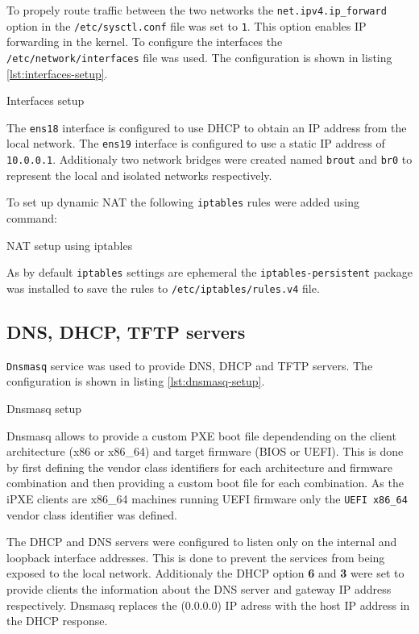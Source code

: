 \documentclass[../main.tex]{subfiles}
\begin{document}
To propely route traffic between the two networks the \texttt{net.ipv4.ip\_forward} option in the \texttt{/etc/sysctl.conf} file was set to \texttt{1}.
This option enables IP forwarding in the kernel.
To configure the interfaces the \texttt{/etc/network/interfaces} file was used. The configuration is shown in listing \ref{lst:interfaces-setup}.

\begin{listing}[H]
  \caption{Interfaces setup}
  \label{lst:interfaces-setup}
\end{listing}

The \texttt{ens18} interface is configured to use DHCP to obtain an IP address from the local network. The \texttt{ens19} interface is configured to use a static IP address of \texttt{10.0.0.1}.
Additionaly two network bridges were created named \texttt{brout} and \texttt{br0} to represent the local and isolated networks respectively.

To set up dynamic NAT the following \texttt{iptables} rules were added using command:

\begin{listing}[H]
  \caption{NAT setup using iptables}
\end{listing}

As by default \texttt{iptables} settings are ephemeral the \texttt{iptables-persistent} package was installed to save the rules to \texttt{/etc/iptables/rules.v4} file.

\subsection{DNS, DHCP, TFTP servers}

\texttt{Dnsmasq} service was used to provide DNS, DHCP and TFTP servers. The configuration is shown in listing \ref{lst:dnsmasq-setup}.

\begin{listing}[H]
  \caption{Dnsmasq setup}
  \label{lst:dnsmasq-setup}
\end{listing}

Dnsmasq allows to provide a custom PXE boot file dependending on the client architecture (x86 or x86\_64) and target firmware (BIOS or UEFI).
This is done by first defining the vendor class identifiers for each architecture and firmware combination and then providing a custom boot file for each combination.
As the iPXE clients are x86\_64 machines running UEFI firmware only the \texttt{UEFI x86\_64} vendor class identifier was defined.

The DHCP and DNS servers were configured to listen only on the internal and loopback interface addresses. This is done to prevent the services from being exposed to the local network.
Additionaly the DHCP option \textbf{6} and \textbf{3} were set to provide clients the information about the DNS server and gateway IP address respectively.
Dnsmasq replaces the (0.0.0.0) IP adress with the host IP address in the DHCP response.
\end{document}
